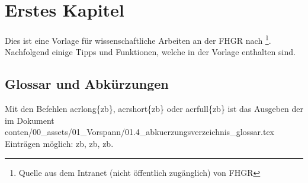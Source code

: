 \chapter{Erstes Kapitel}
\label{kap:eins}
Dies ist eine Vorlage für wissenschaftliche Arbeiten an der FHGR nach \textcite{stepanenko_leitfaden_2023}\footnote{Quelle aus dem Intranet (nicht öffentlich zugänglich) von FHGR}. Nachfolgend einige Tipps und Funktionen, welche in der Vorlage enthalten sind.

\section{Glossar und Abkürzungen}
Mit den Befehlen \setminus acrlong\{zb\}, \setminus acrshort\{zb\} oder \setminus acrfull\{zb\} ist das Ausgeben der im Dokument conten/00\_assets/01\_Vorspann/01.4\_abkuerzungsverzeichnis\_glossar.tex Einträgen möglich: \acrlong{zb}, \acrshort{zb}, \acrfull{zb}.

